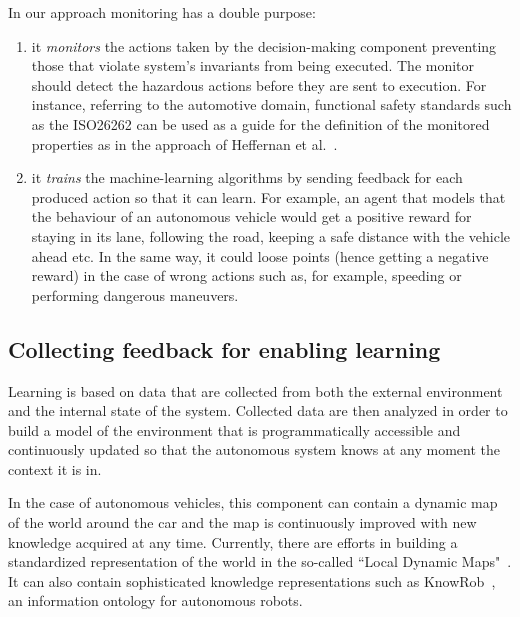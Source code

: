 \documentclass[sigconf,review, anonymous]{acmart}
\begin{document}
In our approach monitoring has a double purpose: 
\begin{enumerate}
    \item it \emph{monitors} the actions taken by the decision-making component preventing those that violate system's invariants from being executed. The monitor should detect the hazardous actions before they are sent to execution. For instance, referring to the automotive domain, functional safety standards such as the ISO26262 can be used as a guide for the definition of the monitored properties as in the approach of Heffernan et al.~\cite{Heffernan:2014fi}.
    \item it \emph{trains} the machine-learning algorithms by sending feedback for each produced action so that it can learn. For example, an agent that models that the behaviour of an autonomous vehicle would get a positive reward for staying in its lane, following the road, keeping a safe distance with the vehicle ahead etc. In the same way, it could loose points (hence getting a negative reward) in the case of wrong actions such as, for example, speeding or performing dangerous maneuvers. 
\end{enumerate}

 

 

 


\subsection{Collecting feedback for enabling learning}

Learning is based on data that are collected from both the external environment and the internal state of the system. 
Collected data are then analyzed in order to build a model of the environment that is programmatically accessible and continuously updated so that the autonomous system knows at any moment the context it is in.

In the case of autonomous vehicles, this component can contain a dynamic map of the world around the car and the map is continuously improved with new knowledge acquired at any time.  
Currently, there are efforts in building a standardized representation of the world in the so-called ``Local Dynamic Maps"~\cite{Shimada:2015gt}. It can also contain sophisticated knowledge representations such as KnowRob~\cite{Tenorth:2015iv}, an information ontology for autonomous robots.
\end{document}
